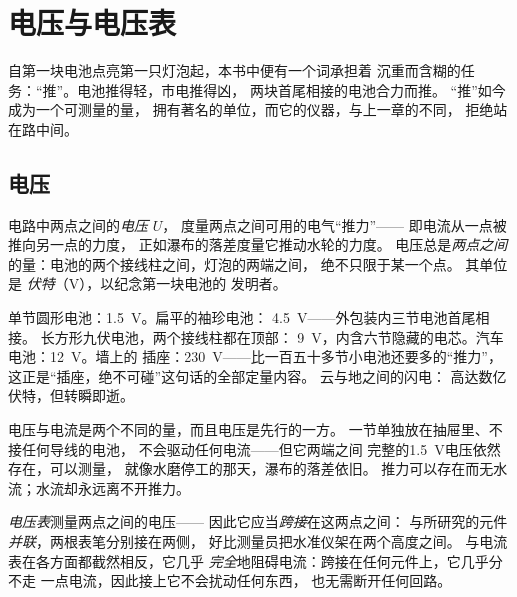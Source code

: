 \chapter{电压与电压表}\label{ch:g8:voltage-voltmeter}

自第一块电池点亮第一只灯泡起，本书中便有一个词承担着
沉重而含糊的任务：“推”。电池推得轻，市电推得凶，
两块首尾相接的电池合力而推。
“推”如今成为一个可测量的量，
拥有著名的单位，而它的仪器，与上一章的不同，
拒绝站在路中间。

\section{电压}

\begin{definition}[电压]\label{def:g8:voltage-voltmeter:voltage}
电路中两点之间的\emph{电压} $U$，
度量两点之间可用的电气“推力”——
即电流从一点被推向另一点的力度，
正如瀑布的落差度量它推动水轮的力度。
电压总是\emph{两点之间}的量：电池的两个接线柱之间，灯泡的两端之间，
绝不只限于某一个点。
其单位是
\emph{伏特}（\unit{V}），以纪念第一块电池的
发明者。
\end{definition}

\begin{example}[伏特家族相册]\label{ex:g8:voltage-voltmeter:values}
单节圆形电池：\qty{1.5}{V}。扁平的袖珍电池：
\qty{4.5}{V}——外包装内三节电池首尾相接。
长方形九伏电池，两个接线柱都在顶部：
\qty{9}{V}，内含六节隐藏的电芯。汽车电池：\qty{12}{V}。墙上的
插座：\qty{230}{V}——比一百五十多节小电池还要多的“推力”，
这正是“插座，绝不可碰”这句话的全部定量内容。
云与地之间的闪电：
高达数亿伏特，但转瞬即逝。
\end{example}

\begin{proposition}[无电流时的电压]\label{prop:g8:voltage-voltmeter:nocurrent}
电压与电流是两个不同的量，而且电压是先行的一方。
一节单独放在抽屉里、不接任何导线的电池，
不会驱动任何电流——但它两端之间
完整的\qty{1.5}{V}电压依然存在，可以测量，
就像水磨停工的那天，瀑布的落差依旧。
推力可以存在而无水流；水流却永远离不开推力。
\end{proposition}

\begin{definition}[电压表]\label{def:g8:voltage-voltmeter:voltmeter}
\emph{电压表}测量两点之间的电压——
因此它应当\emph{跨接}在这两点之间：
与所研究的元件\emph{并联}，两根表笔分别接在两侧，
好比测量员把水准仪架在两个高度之间。
与电流表在各方面都截然相反，它几乎
\emph{完全}地阻碍电流：跨接在任何元件上，它几乎分不走
一点电流，因此接上它不会扰动任何东西，
也无需断开任何回路。
\end{definition}

